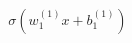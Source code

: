 \documentclass[preview]{standalone}
\begin{document}
\begin{align*}
\sigma(w_1^{(1)} x + b_1^{(1)})
\end{align*}
\end{document}
